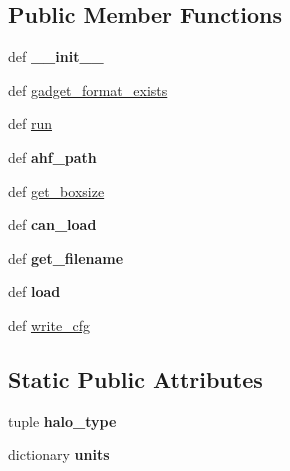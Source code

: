 \subsection*{Public Member Functions}
\begin{DoxyCompactItemize}
\item 
\hypertarget{classseren3_1_1halos_1_1halos_1_1AHFCatalogue_a73a9a64bf2e1ed2498c5c9f8ab0295d3}{
def {\bfseries \_\-\_\-init\_\-\_\-}}
\label{classseren3_1_1halos_1_1halos_1_1AHFCatalogue_a73a9a64bf2e1ed2498c5c9f8ab0295d3}

\item 
def \hyperlink{classseren3_1_1halos_1_1halos_1_1AHFCatalogue_a422ec3eb34ba04173302d5249d78b78b}{gadget\_\-format\_\-exists}
\item 
def \hyperlink{classseren3_1_1halos_1_1halos_1_1AHFCatalogue_a985c910465c63e030ee919df6ab16fcc}{run}
\item 
\hypertarget{classseren3_1_1halos_1_1halos_1_1AHFCatalogue_a41b5d1f9561140554ba1b4dc52f6832d}{
def {\bfseries ahf\_\-path}}
\label{classseren3_1_1halos_1_1halos_1_1AHFCatalogue_a41b5d1f9561140554ba1b4dc52f6832d}

\item 
def \hyperlink{classseren3_1_1halos_1_1halos_1_1AHFCatalogue_a4fa830e24420fe291b6c5614ee835769}{get\_\-boxsize}
\item 
\hypertarget{classseren3_1_1halos_1_1halos_1_1AHFCatalogue_afae55769b2722cedb8f47221b6284cf2}{
def {\bfseries can\_\-load}}
\label{classseren3_1_1halos_1_1halos_1_1AHFCatalogue_afae55769b2722cedb8f47221b6284cf2}

\item 
\hypertarget{classseren3_1_1halos_1_1halos_1_1AHFCatalogue_a255f7647fb2789a78bba40cf1dff0728}{
def {\bfseries get\_\-filename}}
\label{classseren3_1_1halos_1_1halos_1_1AHFCatalogue_a255f7647fb2789a78bba40cf1dff0728}

\item 
\hypertarget{classseren3_1_1halos_1_1halos_1_1AHFCatalogue_ad5c08f2bb115400ede83e60329e13902}{
def {\bfseries load}}
\label{classseren3_1_1halos_1_1halos_1_1AHFCatalogue_ad5c08f2bb115400ede83e60329e13902}

\item 
def \hyperlink{classseren3_1_1halos_1_1halos_1_1AHFCatalogue_a8a748791488ca423b94f656d0feaa891}{write\_\-cfg}
\end{DoxyCompactItemize}
\subsection*{Static Public Attributes}
\begin{DoxyCompactItemize}
\item 
tuple {\bfseries halo\_\-type}
\item 
dictionary {\bfseries units}
\end{DoxyCompactItemize}


